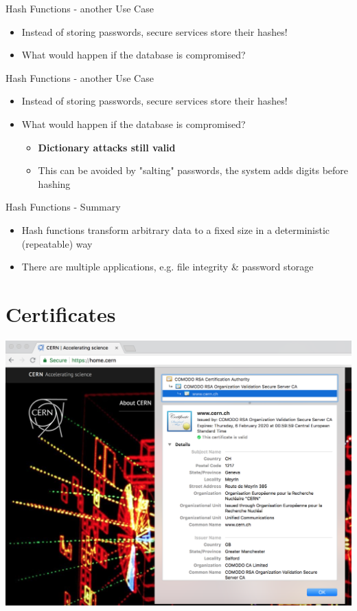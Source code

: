 \documentclass{beamer}
\begin{document}
\begin{frame}{Hash Functions - another Use Case}
\begin{itemize}
\item Instead of storing passwords, secure services store their hashes!
\item What would happen if the database is compromised?
\end{itemize}
\end{frame}

\begin{frame}{Hash Functions - another Use Case}
\begin{itemize}
\item Instead of storing passwords, secure services store their hashes!
\item What would happen if the database is compromised?
\begin{itemize}
\item \textbf{Dictionary attacks still valid}
\item This can be avoided by "salting" passwords, the system adds digits before hashing
\end{itemize}
\end{itemize}
\end{frame}

\begin{frame}{Hash Functions - Summary}
\begin{itemize}
\item Hash functions transform arbitrary data to a fixed size in a deterministic (repeatable) way
\item There are multiple applications, e.g. file integrity \& password storage
\end{itemize}
\end{frame}

\section{Certificates}
\frame{\sectionpage}

\begin{frame}
\begin{center}
\includegraphics[width=0.9\linewidth]{cern-certificate.png}
\end{center}
\end{frame}
\end{document}
